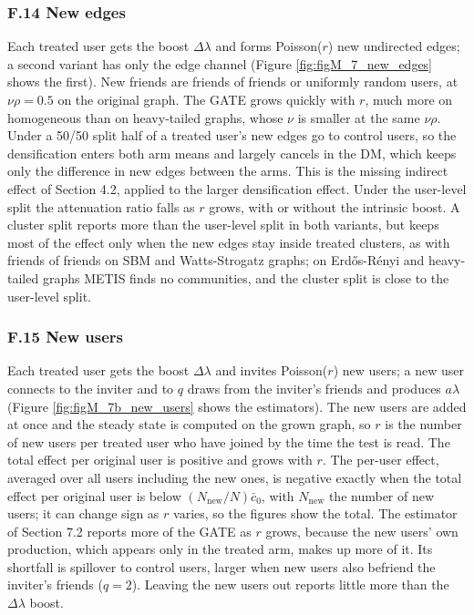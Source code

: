 \documentclass[final,5p,times,twocolumn,number]{elsarticle}
\begin{document}
\subsubsection*{F.14 New edges}

Each treated user gets the boost $\Delta\lambda$  and forms Poisson($r$) new undirected edges; a second variant has only the edge channel (Figure \ref{fig:figM_7_new_edges} shows the first). New friends are friends of friends or uniformly random users, at $\nu\rho = 0.5$  on the original graph. The GATE grows quickly with $r$, much more on homogeneous than on heavy-tailed graphs, whose $\nu$  is smaller at the same $\nu\rho$. Under a 50/50 split half of a treated user's new edges go to control users, so the densification enters both arm means and largely cancels in the DM, which keeps only the difference in new edges between the arms. This is the missing indirect effect of Section 4.2, applied to the larger densification effect. Under the user-level split the attenuation ratio falls as $r$  grows, with or without the intrinsic boost. A cluster split reports more than the user-level split in both variants, but keeps most of the effect only when the new edges stay inside treated clusters, as with friends of friends on SBM and Watts-Strogatz graphs; on Erdős-Rényi and heavy-tailed graphs METIS finds no communities, and the cluster split is close to the user-level split.


\subsubsection*{F.15 New users}

Each treated user gets the boost $\Delta\lambda$  and invites Poisson($r$) new users; a new user connects to the inviter and to $q$  draws from the inviter's friends and produces $a\lambda$  (Figure \ref{fig:figM_7b_new_users} shows the estimators). The new users are added at once and the steady state is computed on the grown graph, so $r$  is the number of new users per treated user who have joined by the time the test is read. The total effect per original user is positive and grows with $r$. The per-user effect, averaged over all users including the new ones, is negative exactly when the total effect per original user is below $(N_{\mathrm{new}}/N)\bar c_0$, with $N_{\mathrm{new}}$  the number of new users; it can change sign as $r$  varies, so the figures show the total. The estimator of Section 7.2 reports more of the GATE as $r$  grows, because the new users' own production, which appears only in the treated arm, makes up more of it. Its shortfall is spillover to control users, larger when new users also befriend the inviter's friends ($q = 2$). Leaving the new users out reports little more than the $\Delta\lambda$  boost.
\end{document}
